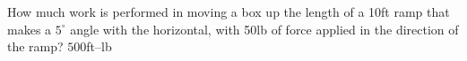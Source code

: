 {How much work is performed in moving a box up the length of a 10ft ramp that makes a $5^\circ$ angle with the horizontal, with 50lb of force applied in the direction of the ramp?
}
{$500$ft--lb
}
